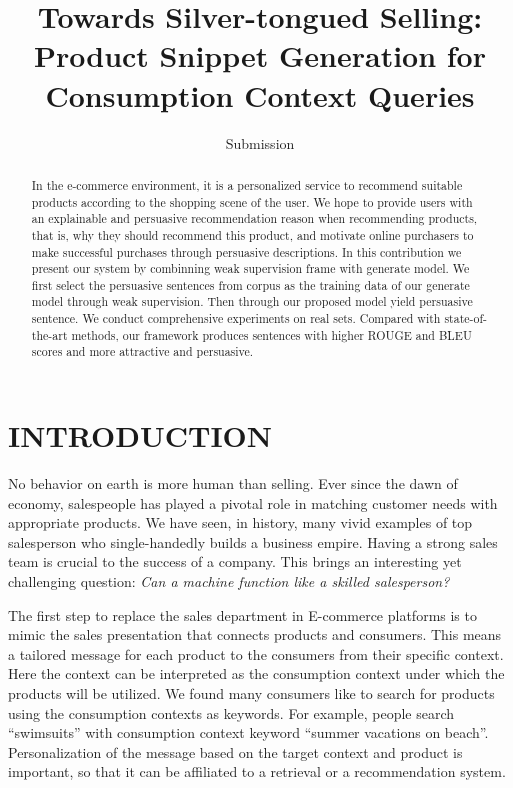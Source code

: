 \documentclass[sigconf]{acmart}
\begin{document}
\title{Towards Silver-tongued Selling: Product Snippet Generation for Consumption Context Queries}

\author{Submission }


\begin{abstract}
In the e-commerce environment, it is a personalized service to recommend suitable products according to the shopping scene of the user. We hope to provide users with an explainable and persuasive recommendation reason when recommending products, that is, why they should recommend this product, and motivate online purchasers to make successful purchases through persuasive descriptions. In this contribution we present our system by combinning weak supervision frame with generate model.  We first select the persuasive sentences from corpus as the training data of our generate model through weak supervision. Then through our proposed model yield persuasive sentence. We conduct comprehensive experiments on real sets. Compared with state-of-the-art methods, our framework produces sentences with higher ROUGE and BLEU scores and more attractive and persuasive.

\end{abstract}



\maketitle

\section{INTRODUCTION}
No behavior on earth is more human than selling.
Ever since the dawn of economy, salespeople has played a pivotal role in matching customer needs with appropriate products. 
We have seen, in history, many vivid examples of top salesperson who single-handedly builds a business empire.
Having a strong sales team is crucial to the success of a company. 
This brings an interesting yet challenging question: \textit{ Can a machine function like a skilled salesperson?} 

The first step to replace the sales department in E-commerce platforms is to mimic the sales presentation that connects products and consumers.
This means a tailored message for each product to the consumers from their specific context. 
Here the context can be interpreted as the consumption context under which the products will be utilized. 
We found many consumers like to search for products using the consumption contexts as keywords. For example, people search ``swimsuits'' with consumption context keyword ``summer vacations on beach''. 
Personalization of the message based on the target context and product is important, so that it can be affiliated to a retrieval or a recommendation system.
\end{document}
